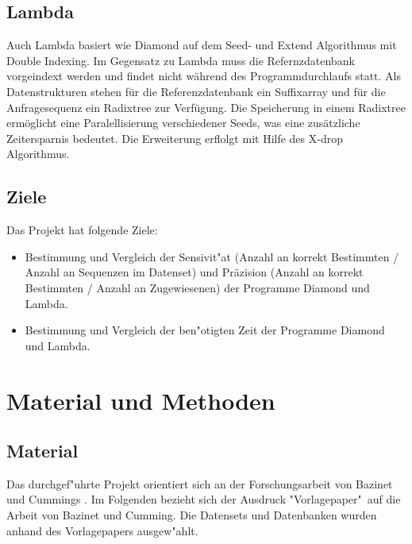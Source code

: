 \documentclass[10pt, a4paper]{article}[08.12.2015]
\begin{document}
    \subsection{\textrm{Lambda}}
    Auch Lambda \cite{hauswedell2014} basiert wie Diamond auf dem Seed- und Extend Algorithmus mit Double Indexing. Im Gegensatz zu Lambda muss die Refernzdatenbank vorgeindext werden und findet nicht w\"ahrend des Programmdurchlaufs statt. Als Datenstrukturen stehen f\"ur die Referenzdatenbank ein Suffixarray und f\"ur die Anfragesequenz ein Radixtree zur Verf\"ugung. Die Speicherung in einem Radixtree erm\"oglicht eine Paralellisierung verschiedener Seeds, was eine zus\"atzliche Zeitersparnis bedeutet. 
    Die Erweiterung erflolgt mit Hilfe des X-drop Algorithmus. 
    \subsection{Ziele}
    
    Das Projekt hat folgende Ziele:
    
    \begin{itemize}
    
      \item Bestimmung und Vergleich der Sensivit"at (Anzahl an korrekt Bestimmten / Anzahl an Sequenzen im Datenset) und Pr\"azision (Anzahl an korrekt Bestimmten / Anzahl an Zugewiesenen) der Programme \textrm{Diamond} 				und \textrm{Lambda}.
      
      \item Bestimmung und Vergleich der ben"otigten Zeit der Programme
      		\textrm{Diamond} und \textrm{Lambda}.

      
    
    \end{itemize}


    \newpage
  \section{Material und Methoden}
    
    \subsection{Material} 
    
      Das durchgef"uhrte Projekt orientiert sich an der Forschungsarbeit von
      Bazinet und Cummings \cite{bazinet2012}. Im 
      Folgenden bezieht sich der Ausdruck "Vorlagepaper"\ auf die Arbeit von
      Bazinet und Cumming. Die Datensets und Datenbanken wurden anhand des 			  Vorlagepapers ausgew"ahlt.
      
\end{document}
